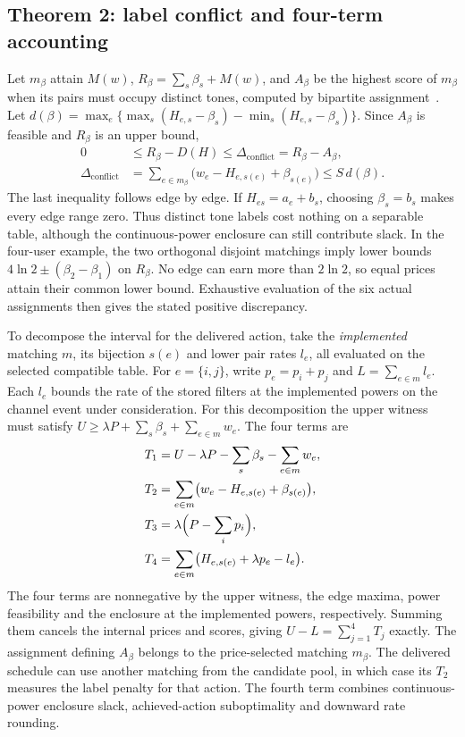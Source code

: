 \documentclass[lineno,pdflatex,sn-nature]{sn-jnl}
\begin{document}
\subsection*{Theorem 2: label conflict and four-term accounting}
Let \(m_\beta\) attain \(M(w)\), \(R_\beta=\sum_s\beta_s+M(w)\), and \(A_\beta\) be the highest score of \(m_\beta\) when its pairs must occupy distinct tones, computed by bipartite assignment~\cite{kuhn}. Let \(d(\beta)=\max_e\{\max_s(H_{e,s}-\beta_s)-\min_s(H_{e,s}-\beta_s)\}\). Since \(A_\beta\) is feasible and \(R_\beta\) is an upper bound,
\begin{equation}
\begin{aligned}
0 &\le R_\beta-D(H)\le\Delta_{\mathrm{conflict}}=R_\beta-A_\beta,\\
\Delta_{\mathrm{conflict}} &=\sum_{e\in m_\beta}\bigl(w_e-H_{e,s(e)}+\beta_{s(e)}\bigr)
       \le S\,d(\beta).
\end{aligned}
\label{eq:conflict}
\end{equation}
The last inequality follows edge by edge. If \(H_{es}=a_e+b_s\), choosing \(\beta_s=b_s\) makes every edge range zero. Thus distinct tone labels cost nothing on a separable table, although the continuous-power enclosure can still contribute slack. In the four-user example, the two orthogonal disjoint matchings imply lower bounds \(4\ln2\pm(\beta_2-\beta_1)\) on \(R_\beta\). No edge can earn more than \(2\ln2\), so equal prices attain their common lower bound. Exhaustive evaluation of the six actual assignments then gives the stated positive discrepancy.

To decompose the interval for the delivered action, take the \emph{implemented} matching \(m\), its bijection \(s(e)\) and lower pair rates \(l_e\), all evaluated on the selected compatible table. For \(e=\{i,j\}\), write \(p_e=p_i+p_j\) and \(L=\sum_{e\in m}l_e\). Each \(l_e\) bounds the rate of the stored filters at the implemented powers on the channel event under consideration. For this decomposition the upper witness must satisfy \(U\geq\lambda P+\sum_s\beta_s+\sum_{e\in m}w_e\). The four terms are
\begin{equation}
\begin{aligned}
 T_1 &= U-\lambda P-\sum_s\beta_s-\sum_{e\in m}w_e,\\
 T_2 &= \sum_{e\in m}\bigl(w_e-H_{e,s(e)}+\beta_{s(e)}\bigr),\\
 T_3 &= \lambda\Bigl(P-\sum_i p_i\Bigr),\\
 T_4 &= \sum_{e\in m}\bigl(H_{e,s(e)}+\lambda p_e-l_e\bigr).
\end{aligned}
\label{eq:decomposition}
\end{equation}
The four terms are nonnegative by the upper witness, the edge maxima, power feasibility and the enclosure at the implemented powers, respectively. Summing them cancels the internal prices and scores, giving \(U-L=\sum_{j=1}^4T_j\) exactly. The assignment defining \(A_\beta\) belongs to the price-selected matching \(m_\beta\). The delivered schedule can use another matching from the candidate pool, in which case its \(T_2\) measures the label penalty for that action. The fourth term combines continuous-power enclosure slack, achieved-action suboptimality and downward rate rounding.
\end{document}
